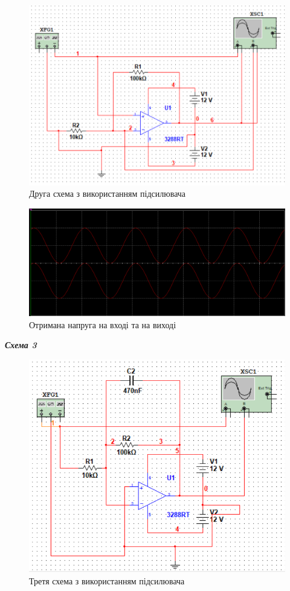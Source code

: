 \begin{figure}[ht]

\centering

\includegraphics[width=0.7\linewidth]{Pic/circuit_2_screen.png}

\caption{Друга схема з використанням підсилювача}

\label{Prac3}

\end{figure}
\begin{figure}[ht]

\centering

\includegraphics[width=0.7\linewidth]{Pic/circuit_2_plot.png}

\caption{Отримана напруга на вході та на виході}

\label{Prac4}

\end{figure}
\newpage
\begin{center}
  {\textbf{\emph{Схема 3}}}
\end{center}
\begin{figure}[ht]

\centering

\includegraphics[width=0.7\linewidth]{Pic/circuit_3_screen.png}

\caption{Третя схема з використанням підсилювача}

\label{Prac1}


\end{figure}
